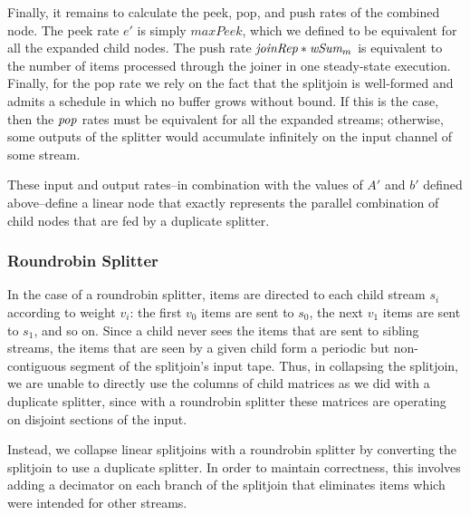 Finally, it remains to calculate the peek, pop, and push rates of the
combined node.  The peek rate $e'$ is simply $maxPeek$, which we
defined to be equivalent for all the expanded child nodes.  The push
rate $\mbox{\it joinRep}*\mbox{\it wSum}_m$ is equivalent to the number of items
processed through the joiner in one steady-state execution.  Finally,
for the pop rate we rely on the fact that the splitjoin is well-formed
and admits a schedule in which no buffer grows without bound.  If this
is the case, then the $\mbox{\it pop}$ rates must be equivalent for all the
expanded streams; otherwise, some outputs of the splitter would
accumulate infinitely on the input channel of some stream.  

These input and output rates--in combination with the values of $A'$
and $b'$ defined above--define a linear node that exactly represents
the parallel combination of child nodes that are fed by a duplicate
splitter.

\subsubsection{Roundrobin Splitter}

In the case of a roundrobin splitter, items are directed to each child
stream $s_i$ according to weight $v_i$: the first $v_0$ items are sent
to $s_0$, the next $v_1$ items are sent to $s_1$, and so on.  Since a
child never sees the items that are sent to sibling streams, the items
that are seen by a given child form a periodic but non-contiguous
segment of the splitjoin's input tape.  Thus, in collapsing the
splitjoin, we are unable to directly use the columns of child matrices
as we did with a duplicate splitter, since with a roundrobin splitter
these matrices are operating on disjoint sections of the input.

Instead, we collapse linear splitjoins with a roundrobin splitter by
converting the splitjoin to use a duplicate splitter.  In order to
maintain correctness, this involves adding a decimator on each branch
of the splitjoin that eliminates items which were intended for other
streams.

